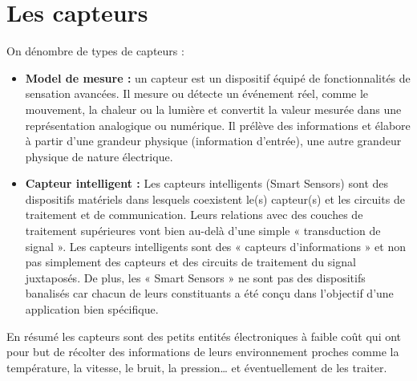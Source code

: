\section{Les capteurs}

On dénombre de types de capteurs :
\renewcommand\labelitemi{\textbullet}
\begin{itemize}

\item \textbf{Model de mesure :} un capteur est un dispositif équipé de fonctionnalités de sensation avancées. Il mesure ou détecte un événement réel, comme le mouvement, la chaleur ou la lumière et convertit la valeur mesurée dans une représentation analogique ou numérique. Il prélève des informations et élabore à partir d’une grandeur physique (information d’entrée), une autre grandeur physique de nature électrique.

\item \textbf{Capteur intelligent :} Les capteurs intelligents (Smart Sensors) sont des dispositifs matériels dans lesquels coexistent le(s) capteur(s) et les circuits de traitement et de communication. Leurs relations avec des couches de traitement supérieures vont bien au-delà d’une simple « transduction de signal ». Les capteurs intelligents sont des « capteurs d’informations » et non pas simplement des capteurs et des circuits de traitement du signal juxtaposés. De plus, les « Smart Sensors » ne sont pas des dispositifs banalisés car chacun de leurs constituants a été conçu dans l’objectif d’une application bien spécifique.

\end{itemize}

En résumé les capteurs sont des petits entités électroniques à faible coût qui ont pour but de récolter des informations de leurs environnement proches comme la température, la vitesse, le bruit, la pression… et éventuellement de les traiter.

